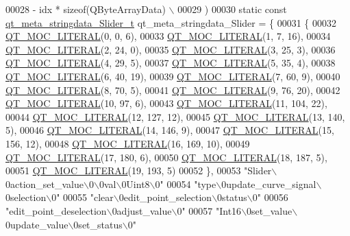 \begin{DoxyCode}
00028 \textcolor{preprocessor}{        - idx * sizeof(QByteArrayData) \(\backslash\)}
00029 \textcolor{preprocessor}{    )}
00030 \textcolor{keyword}{static} \textcolor{keyword}{const} \hyperlink{a00070_d3/dd1/a00214}{qt\_meta\_stringdata\_Slider\_t} qt\_meta\_stringdata\_Slider = \{
00031     \{
00032 \hyperlink{a00070_a75bb9482d242cde0a06c9dbdc6b83abe}{QT\_MOC\_LITERAL}(0, 0, 6),
00033 \hyperlink{a00070_a75bb9482d242cde0a06c9dbdc6b83abe}{QT\_MOC\_LITERAL}(1, 7, 16),
00034 \hyperlink{a00070_a75bb9482d242cde0a06c9dbdc6b83abe}{QT\_MOC\_LITERAL}(2, 24, 0),
00035 \hyperlink{a00070_a75bb9482d242cde0a06c9dbdc6b83abe}{QT\_MOC\_LITERAL}(3, 25, 3),
00036 \hyperlink{a00070_a75bb9482d242cde0a06c9dbdc6b83abe}{QT\_MOC\_LITERAL}(4, 29, 5),
00037 \hyperlink{a00070_a75bb9482d242cde0a06c9dbdc6b83abe}{QT\_MOC\_LITERAL}(5, 35, 4),
00038 \hyperlink{a00070_a75bb9482d242cde0a06c9dbdc6b83abe}{QT\_MOC\_LITERAL}(6, 40, 19),
00039 \hyperlink{a00070_a75bb9482d242cde0a06c9dbdc6b83abe}{QT\_MOC\_LITERAL}(7, 60, 9),
00040 \hyperlink{a00070_a75bb9482d242cde0a06c9dbdc6b83abe}{QT\_MOC\_LITERAL}(8, 70, 5),
00041 \hyperlink{a00070_a75bb9482d242cde0a06c9dbdc6b83abe}{QT\_MOC\_LITERAL}(9, 76, 20),
00042 \hyperlink{a00070_a75bb9482d242cde0a06c9dbdc6b83abe}{QT\_MOC\_LITERAL}(10, 97, 6),
00043 \hyperlink{a00070_a75bb9482d242cde0a06c9dbdc6b83abe}{QT\_MOC\_LITERAL}(11, 104, 22),
00044 \hyperlink{a00070_a75bb9482d242cde0a06c9dbdc6b83abe}{QT\_MOC\_LITERAL}(12, 127, 12),
00045 \hyperlink{a00070_a75bb9482d242cde0a06c9dbdc6b83abe}{QT\_MOC\_LITERAL}(13, 140, 5),
00046 \hyperlink{a00070_a75bb9482d242cde0a06c9dbdc6b83abe}{QT\_MOC\_LITERAL}(14, 146, 9),
00047 \hyperlink{a00070_a75bb9482d242cde0a06c9dbdc6b83abe}{QT\_MOC\_LITERAL}(15, 156, 12),
00048 \hyperlink{a00070_a75bb9482d242cde0a06c9dbdc6b83abe}{QT\_MOC\_LITERAL}(16, 169, 10),
00049 \hyperlink{a00070_a75bb9482d242cde0a06c9dbdc6b83abe}{QT\_MOC\_LITERAL}(17, 180, 6),
00050 \hyperlink{a00070_a75bb9482d242cde0a06c9dbdc6b83abe}{QT\_MOC\_LITERAL}(18, 187, 5),
00051 \hyperlink{a00070_a75bb9482d242cde0a06c9dbdc6b83abe}{QT\_MOC\_LITERAL}(19, 193, 5)
00052     \},
00053     \textcolor{stringliteral}{"Slider\(\backslash\)0action\_set\_value\(\backslash\)0\(\backslash\)0val\(\backslash\)0Uint8\(\backslash\)0"}
00054     \textcolor{stringliteral}{"type\(\backslash\)0update\_curve\_signal\(\backslash\)0selection\(\backslash\)0"}
00055     \textcolor{stringliteral}{"clear\(\backslash\)0edit\_point\_selection\(\backslash\)0status\(\backslash\)0"}
00056     \textcolor{stringliteral}{"edit\_point\_deselection\(\backslash\)0adjust\_value\(\backslash\)0"}
00057     \textcolor{stringliteral}{"Int16\(\backslash\)0set\_value\(\backslash\)0update\_value\(\backslash\)0set\_status\(\backslash\)0"}

\end{DoxyCode}
